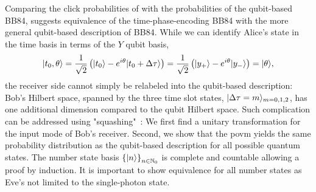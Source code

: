 Comparing the click probabilities of  with the probabilities of the qubit-based BB84, suggests equivalence of the time-phase-encoding BB84 with the more general qubit-based description of BB84.
While we can identify Alice's state in the time basis in terms of the $Y$ qubit basis,
\begin{equation}
	\lvert t_0,\theta\rangle
	=
	\frac{1}{\sqrt{2}}
	\left(
		\lvert t_0\rangle
		-
		e^{i\theta}
		\lvert t_0+\Delta\tau\rangle
	\right)
	=
	\frac{1}{\sqrt{2}}
	\left(
		\lvert y_+\rangle
		-
		e^{i\theta}
		\lvert y_-\rangle
	\right)
	=
	\lvert\theta\rangle
	,
\end{equation}
the receiver side cannot simply be relabeled into the qubit-based description:
Bob's Hilbert space, spanned by the three time slot states, $\lvert\Delta\tau=m\rangle_{m=0,1,2}$, has one additional dimension compared to the qubit Hilbert space.
Such complication can be addressed using "squashing"~\cite{Beaudry2008,Gittsovich2014}:
We first find a unitary transformation for the input mode of Bob's receiver.
Second, we show that the \gls{povm} yields the same probability distribution as the qubit-based description for all possible quantum states.
The number state basis $\left\{\lvert n\rangle\right\}_{n\in\mathbb{N}_0}$ is complete and countable allowing a proof by induction.
It is important to show equivalence for all number states as Eve's not limited to the single-photon state.
